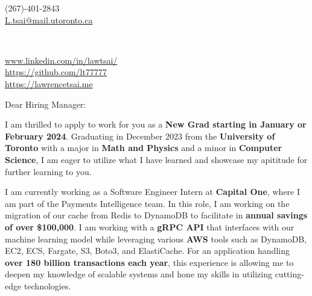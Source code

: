 \documentclass[10.5pt,a4]{article}
\begin{document}
\begin{center}
    \begin{minipage}[b]{0.24\textwidth}
            \large (267)-401-2843 \\
            \large \href{mailto:L.tsai@mail.utoronto.ca}{L.tsai@mail.utoronto.ca} 
    \end{minipage}%
    \begin{minipage}[b]{0.5\textwidth}
             \\ %
            \vspace{0.1cm}
            {\color{UI_blue} \Large{}}
    \end{minipage}%
    \begin{minipage}[b]{0.33\textwidth}
            \flushright \small
            {\href{www.linkedin.com/in/lawtsai/}{www.linkedin.com/in/lawtsai/} } \\
            \href{https://github.com/lt77777}{https://github.com/lt77777} \\
            \href{https://lawrencetsai.me}
            {https://lawrencetsai.me}
    \end{minipage}   
    
\vspace{-0.15cm} 
{\color{UI_blue} \hrulefill}
\end{center}

\justify
\setlength{\parindent}{0pt}
\setlength{\parskip}{12pt}
\vspace{0.2cm}




Dear Hiring Manager:

I am thrilled to apply to work for you as a \textbf{New Grad starting in January or February 2024}. Graduating in December 2023 from the \textbf{University of Toronto} with a major in \textbf{Math and Physics} and a minor in \textbf{Computer Science}, I am eager to utilize what I have learned and showcase my apititude for further learning to you.

I am currently working as a Software Engineer Intern at \textbf{Capital One}, where I am part of the Payments Intelligence team. In this role, I am working on the migration of our cache from Redis to DynamoDB to facilitate in \textbf{annual savings of over \$100,000}. I am working with a \textbf{gRPC API} that interfaces with our machine learning model while leveraging various \textbf{AWS} tools such as DynamoDB, EC2, ECS, Fargate, S3, Boto3, and ElastiCache. For an application handling \textbf{over 180 billion transactions each year}, this experience is allowing me to deepen my knowledge of scalable systems and hone my skills in utilizing cutting-edge technologies.
\end{document}
